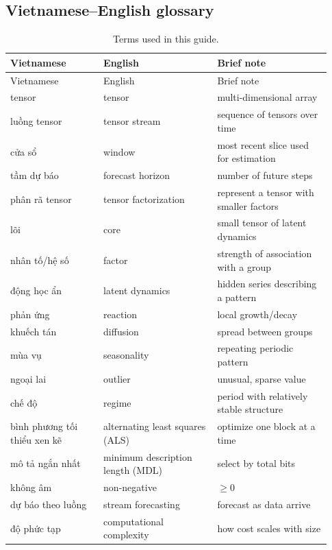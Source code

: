 \subsection*{Vietnamese--English glossary}

\begin{longtable}{@{}>{\raggedright\arraybackslash}p{0.27\linewidth}>{\raggedright\arraybackslash}p{0.33\linewidth}>{\raggedright\arraybackslash}p{0.33\linewidth}@{}}
  \caption{Terms used in this guide.}\label{tab:glossary}\\
  \toprule
  Vietnamese & English & Brief note \\
  \midrule
  \endfirsthead
  \toprule
  Vietnamese & English & Brief note \\
  \midrule
  \endhead
  tensor & tensor & multi-dimensional array \\
  luồng tensor & tensor stream & sequence of tensors over time \\
  cửa sổ & window & most recent slice used for estimation \\
  tầm dự báo & forecast horizon & number of future steps \\
  phân rã tensor & tensor factorization & represent a tensor with smaller factors \\
  lõi & core & small tensor of latent dynamics \\
  nhân tố/hệ số & factor & strength of association with a group \\
  động học ẩn & latent dynamics & hidden series describing a pattern \\
  phản ứng & reaction & local growth/decay \\
  khuếch tán & diffusion & spread between groups \\
  mùa vụ & seasonality & repeating periodic pattern \\
  ngoại lai & outlier & unusual, sparse value \\
  chế độ & regime & period with relatively stable structure \\
  bình phương tối thiểu xen kẽ & alternating least squares (ALS) & optimize one block at a time \\
  mô tả ngắn nhất & minimum description length (MDL) & select by total bits \\
  không âm & non-negative & $\ge 0$ \\
  dự báo theo luồng & stream forecasting & forecast as data arrive \\
  độ phức tạp & computational complexity & how cost scales with size \\
  \bottomrule
\end{longtable}

